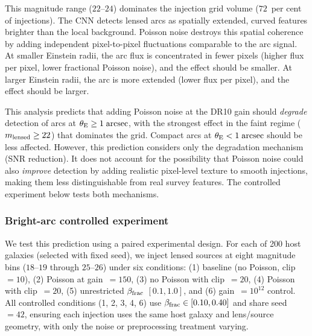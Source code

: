 \documentclass[fleqn,usenatbib]{mnras}
\begin{document}
This magnitude range ($22$--$24$) dominates the injection grid volume ($72$~per cent of injections).  The CNN detects lensed arcs as spatially extended, curved features brighter than the local background.  Poisson noise destroys this spatial coherence by adding independent pixel-to-pixel fluctuations comparable to the arc signal.  At smaller Einstein radii, the arc flux is concentrated in fewer pixels (higher flux per pixel, lower fractional Poisson noise), and the effect should be smaller.  At larger Einstein radii, the arc is more extended (lower flux per pixel), and the effect should be larger.

This analysis predicts that adding Poisson noise at the DR10 gain should \emph{degrade} detection of arcs at $\theta_{\rm E} \geq 1\;\mathrm{arcsec}$, with the strongest effect in the faint regime ($m_{\rm lensed} \geq 22$) that dominates the grid.  Compact arcs at $\theta_{\rm E} < 1\;\mathrm{arcsec}$ should be less affected.  However, this prediction considers only the degradation mechanism (SNR reduction).  It does not account for the possibility that Poisson noise could also \emph{improve} detection by adding realistic pixel-level texture to smooth injections, making them less distinguishable from real survey features.  The controlled experiment below tests both mechanisms.


\subsubsection{Bright-arc controlled experiment}
\label{sec:brightarc}

We test this prediction using a paired experimental design.  For each of 200 host galaxies (selected with fixed seed), we inject lensed sources at eight magnitude bins ($18$--$19$ through $25$--$26$) under six conditions: (1) baseline (no Poisson, clip~$= 10$), (2) Poisson at gain~$= 150$, (3) no Poisson with clip~$= 20$, (4) Poisson with clip~$= 20$, (5) unrestricted $\beta_{\rm frac}$ $[0.1, 1.0]$, and (6) gain~$= 10^{12}$ control.  All controlled conditions (1, 2, 3, 4, 6) use $\beta_{\rm frac} \in [0.10, 0.40]$ and share seed~$= 42$, ensuring each injection uses the same host galaxy and lens/source geometry, with only the noise or preprocessing treatment varying.
\end{document}
